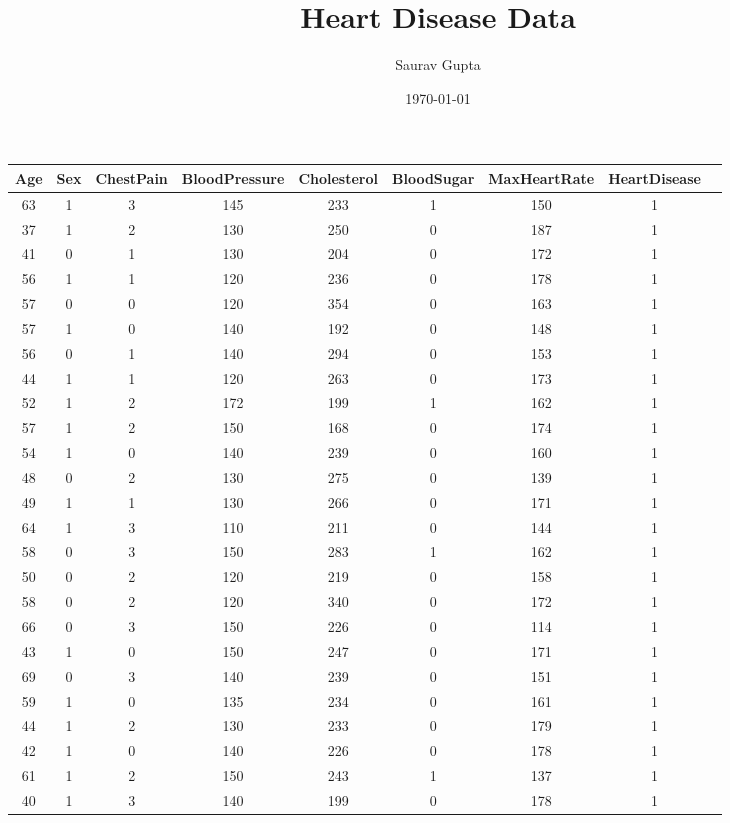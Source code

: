 \documentclass{article}
\title{Heart Disease Data}
\author{Saurav Gupta}
\date{\today}
\begin{document}
\maketitle
\begin{longtable}{
|
c|c|c|c|c|c|c|c|c|}
\hline
Age & Sex & ChestPain & BloodPressure & Cholesterol & BloodSugar & MaxHeartRate & HeartDisease \\
\hline
\endfirsthead
\hline
63 & 1 & 3 & 145 & 233 & 1 & 150 & 1 \\
\hline
37 & 1 & 2 & 130 & 250 & 0 & 187 & 1 \\
\hline
41 & 0 & 1 & 130 & 204 & 0 & 172 & 1 \\
\hline
56 & 1 & 1 & 120 & 236 & 0 & 178 & 1 \\
\hline
57 & 0 & 0 & 120 & 354 & 0 & 163 & 1 \\
\hline
57 & 1 & 0 & 140 & 192 & 0 & 148 & 1 \\
\hline
56 & 0 & 1 & 140 & 294 & 0 & 153 & 1 \\
\hline
44 & 1 & 1 & 120 & 263 & 0 & 173 & 1 \\
\hline
52 & 1 & 2 & 172 & 199 & 1 & 162 & 1 \\
\hline
57 & 1 & 2 & 150 & 168 & 0 & 174 & 1 \\
\hline
54 & 1 & 0 & 140 & 239 & 0 & 160 & 1 \\
\hline
48 & 0 & 2 & 130 & 275 & 0 & 139 & 1 \\
\hline
49 & 1 & 1 & 130 & 266 & 0 & 171 & 1 \\
\hline
64 & 1 & 3 & 110 & 211 & 0 & 144 & 1 \\
\hline
58 & 0 & 3 & 150 & 283 & 1 & 162 & 1 \\
\hline
50 & 0 & 2 & 120 & 219 & 0 & 158 & 1 \\
\hline
58 & 0 & 2 & 120 & 340 & 0 & 172 & 1 \\
\hline
66 & 0 & 3 & 150 & 226 & 0 & 114 & 1 \\
\hline
43 & 1 & 0 & 150 & 247 & 0 & 171 & 1 \\
\hline
69 & 0 & 3 & 140 & 239 & 0 & 151 & 1 \\
\hline
59 & 1 & 0 & 135 & 234 & 0 & 161 & 1 \\
\hline
44 & 1 & 2 & 130 & 233 & 0 & 179 & 1 \\
\hline
42 & 1 & 0 & 140 & 226 & 0 & 178 & 1 \\
\hline
61 & 1 & 2 & 150 & 243 & 1 & 137 & 1 \\
\hline
40 & 1 & 3 & 140 & 199 & 0 & 178 & 1 \\
\hline

\end{longtable}
\end{document}
